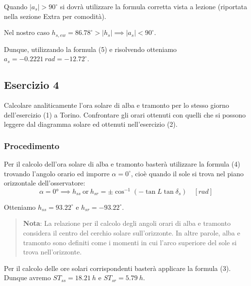 \documentclass[11pt]{article}
\begin{document}
    Quando \(|a_s|>90^{{\circ}}\) si dovrà utilizzare la formula corretta
vista a lezione (riportata nella sezione Extra per comodità).
 
            
    
    Nel nostro caso
\(h_{s,ew}=86.78^{\circ}>|h_s| \implies |a_s|<90^{\circ}\).

    
 
            
    
    Dunque, utilizzando la formula (5) e risolvendo otteniamo
\(a_s=-0.2221\ rad= -12.72^{\circ}\).

    

    \hypertarget{esercizio-4}{%
\subsection{Esercizio 4}\label{esercizio-4}}

Calcolare analiticamente l'ora solare di alba e tramonto per lo stesso
giorno dell'esercizio (1) a Torino. Confrontare gli orari ottenuti con
quelli che si possono leggere dal diagramma solare ed ottenuti
nell'esercizio (2).

\hypertarget{procedimento}{%
\subsubsection{Procedimento}\label{procedimento}}

Per il calcolo dell'ora solare di alba e tramonto basterà utilizzare la
formula (4) trovando l'angolo orario ed imporre \(\alpha=0^\circ\), cioè
quando il sole si trova nel piano orizzontale dell'osservatore:
\[\alpha=0° \implies h_{ss} \ \text{or} \ h_{sr} = \pm \cos^{-1}\left ( -\tan L \tan \delta_s \right ) \quad [rad]\]
 
            
    
    Otteniamo \(h_{ss}=93.22^{\circ}\) e \(h_{sr}=-93.22^{\circ}\).

    

    \begin{quote}
\textbf{Nota}: La relazione per il calcolo degli angoli orari di alba e
tramonto considera il centro del cerchio solare sull'orizzonte. In altre
parole, alba e tramonto sono definiti come i momenti in cui l'arco
superiore del sole si trova nell'orizzonte.
\end{quote}
 
            
    
    Per il calcolo delle ore solari corrispondenti basterà applicare la
formula (3). Dunque avremo \(ST_{ss}=18.21\ h\) e \(ST_{sr}=5.79\ h\).
\end{document}
